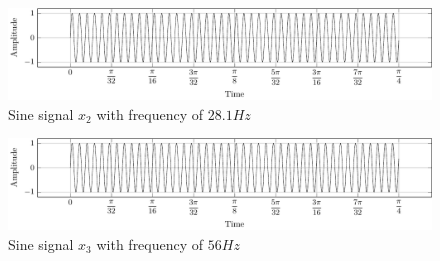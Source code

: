 \documentclass[../../course]{subfiles}
\begin{document}
\begin{figure} [H]
    \centering
     {
        \includegraphics[height = 0.8\textheight] {tikzpics/plotSeqX2.pdf}
    }
     {Sine signal $x_{2}$ with frequency of $28.1 \si{Hz}$}
    \label{plt:seqx2}
\end{figure}

\begin{figure} [H]
    \centering
     {
        \includegraphics[height = 0.8\textheight] {tikzpics/plotSeqX3.pdf}
    }
     {Sine signal $x_{3}$ with frequency of $56 \si{Hz}$}
    \label{plt:seqx3}
\end{figure}
\end{document}
